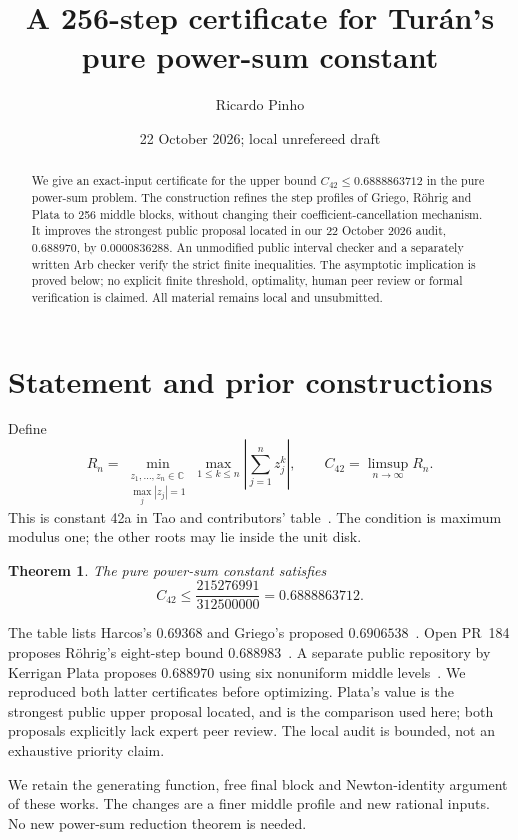 \documentclass[11pt]{amsart}
\title[A step-profile certificate for Turan's constant]{A 256-step certificate for Tur\'an's pure power-sum constant}
\author{Ricardo Pinho}
\date{22 October 2026; local unrefereed draft}
\newtheorem{theorem}{Theorem}
\newcommand{\CC}{\mathbb C}
\begin{document}
\begin{abstract}
We give an exact-input certificate for the upper bound
$C_{42}\le0.6888863712$ in the pure power-sum problem. The construction
refines the step profiles of Griego, R\"ohrig and Plata to 256 middle
blocks, without changing their coefficient-cancellation mechanism.
It improves the strongest public proposal located in our 22 October 2026
audit, $0.688970$, by $0.0000836288$. An unmodified public interval
checker and a separately written Arb checker verify the strict finite
inequalities. The asymptotic implication is proved below; no explicit
finite threshold, optimality, human peer review or formal verification
is claimed. All material remains local and unsubmitted.
\end{abstract}
\maketitle

\section{Statement and prior constructions}
Define
\[
 R_n=\min_{\substack{z_1,\ldots,z_n\in\CC\\\max_j|z_j|=1}}
       \max_{1\le k\le n}\left|\sum_{j=1}^n z_j^k\right|,
 \qquad C_{42}=\limsup_{n\to\infty}R_n.
\]
This is constant 42a in Tao and contributors' table~\cite{table}.
The condition is maximum modulus one; the other roots may lie inside
the unit disk.

\begin{theorem}\label{thm:main}
The pure power-sum constant satisfies
\[
 C_{42}\le\frac{215276991}{312500000}=0.6888863712.
\]
\end{theorem}

The table lists Harcos's $0.69368$ and Griego's proposed
$0.6906538$~\cite{biro,griego}. Open PR~184 proposes R\"ohrig's
eight-step bound $0.688983$~\cite{roehrig}. A separate public repository
by Kerrigan Plata proposes $0.688970$ using six nonuniform middle
levels~\cite{plata}. We reproduced both latter certificates before
optimizing. Plata's value is the strongest public upper proposal located,
and is the comparison used here; both proposals explicitly lack expert
peer review. The local audit is bounded, not an exhaustive priority claim.

We retain the generating function, free final block and Newton-identity
argument of these works. The changes are a finer middle profile and
new rational inputs. No new power-sum reduction theorem is needed.
\end{document}
